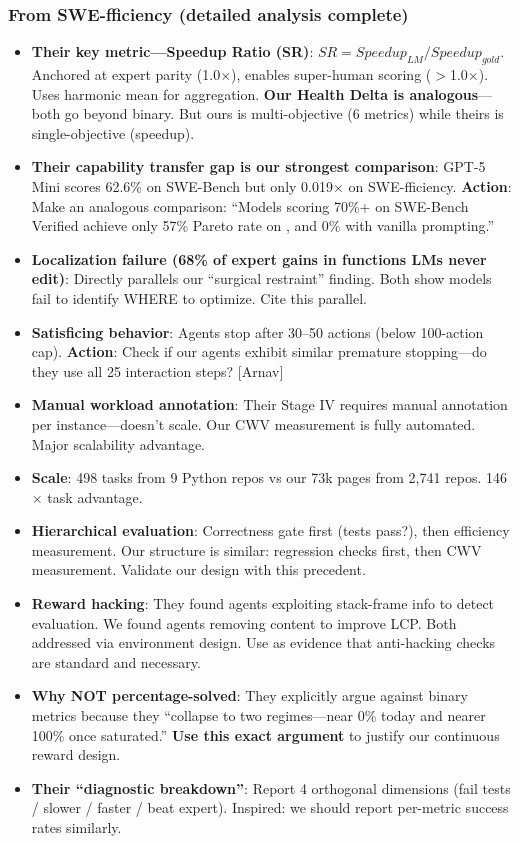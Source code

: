 \subsubsection{From SWE-fficiency (detailed analysis complete)}
\begin{itemize}
    \item \textbf{Their key metric---Speedup Ratio (SR)}: $SR = Speedup_{LM} / Speedup_{gold}$. Anchored at expert parity (1.0$\times$), enables super-human scoring ($>$1.0$\times$). Uses harmonic mean for aggregation. \textbf{Our Health Delta is analogous}---both go beyond binary. But ours is multi-objective (6 metrics) while theirs is single-objective (speedup).
    \item \textbf{Their capability transfer gap is our strongest comparison}: GPT-5 Mini scores 62.6\% on SWE-Bench but only 0.019$\times$ on SWE-fficiency. \textbf{Action}: Make an analogous comparison: ``Models scoring 70\%+ on SWE-Bench Verified achieve only 57\% Pareto rate on \OurBench, and 0\% with vanilla prompting.''
    \item \textbf{Localization failure (68\% of expert gains in functions LMs never edit)}: Directly parallels our ``surgical restraint'' finding. Both show models fail to identify WHERE to optimize. Cite this parallel.
    \item \textbf{Satisficing behavior}: Agents stop after 30--50 actions (below 100-action cap). \textbf{Action}: Check if our agents exhibit similar premature stopping---do they use all 25 interaction steps? [Arnav]
    \item \textbf{Manual workload annotation}: Their Stage IV requires manual annotation per instance---doesn't scale. Our CWV measurement is fully automated. Major scalability advantage.
    \item \textbf{Scale}: 498 tasks from 9 Python repos vs our 73k pages from 2,741 repos. 146$\times$ task advantage.
    \item \textbf{Hierarchical evaluation}: Correctness gate first (tests pass?), then efficiency measurement. Our structure is similar: regression checks first, then CWV measurement. Validate our design with this precedent.
    \item \textbf{Reward hacking}: They found agents exploiting stack-frame info to detect evaluation. We found agents removing content to improve LCP. Both addressed via environment design. Use as evidence that anti-hacking checks are standard and necessary.
    \item \textbf{Why NOT percentage-solved}: They explicitly argue against binary metrics because they ``collapse to two regimes---near 0\% today and nearer 100\% once saturated.'' \textbf{Use this exact argument} to justify our continuous reward design.
    \item \textbf{Their ``diagnostic breakdown''}: Report 4 orthogonal dimensions (fail tests / slower / faster / beat expert). Inspired: we should report per-metric success rates similarly.
\end{itemize}

